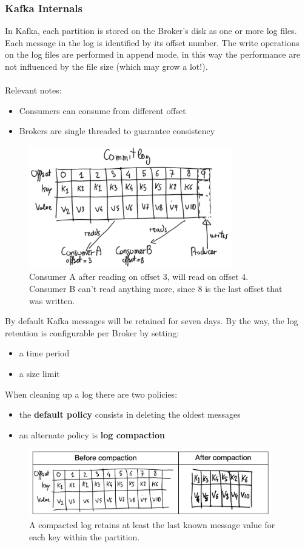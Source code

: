 \documentclass[10pt,a4paper]{article}
\newcommand{\nline}{\\~\\}
\begin{document}
\subsubsection{Kafka Internals}
In Kafka, each partition is stored on the Broker's disk as one or more log files. Each message in the log is identified by its offset number. The write operations on the log files are performed in append mode, in this way the performance are not influenced by the file size (which may grow a lot!). 
\nline
Relevant notes:
\begin{itemize}
	\item Consumers can consume from different offset
	\item Brokers are single threaded to guarantee consistency
\end{itemize}

\begin{figure}[ht!]
 \hfill \includegraphics[width=250pt]{images/kafka-physical-partition2}\hspace*{\fill}
 \caption{Consumer A after reading on offset 3, will read on offset 4. Consumer B can't read anything more, since 8 is the last offset that was written.}
\end{figure}

By default Kafka messages will be retained for seven days. By the way, the log retention is configurable per Broker by setting:
\begin{itemize}
	\item a time period
	\item a size limit
\end{itemize}
When cleaning up a log there are two policies:
\begin{itemize}
	\item the \textbf{default policy} consists in deleting the oldest messages
	\item an alternate policy is \textbf{log compaction}
\end{itemize}

\begin{figure}[ht!]
 \hfill \includegraphics[width=300pt]{images/kafka-log-compaction}\hspace*{\fill}
 \caption{A compacted log retains at least the last known message value for each key within the partition.}
\end{figure} 
\end{document}
